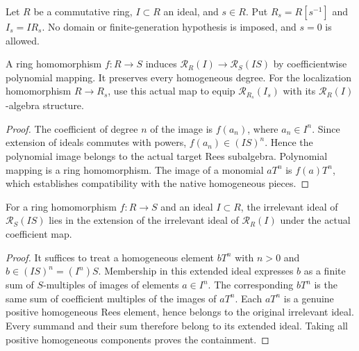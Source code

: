\endgroup

\begingroup

Let $R$ be a commutative ring, $I\subset R$ an ideal, and $s\in R$.
Put $R_s=R[s^{-1}]$ and $I_s=IR_s$. No domain or finite-generation
hypothesis is imposed, and $s=0$ is allowed.

\begin{definition}
\label{def:rees-localization-map}
\leanok
A ring homomorphism $f:R\to S$ induces
$\mathcal R_R(I)\to\mathcal R_S(IS)$ by coefficientwise polynomial
mapping. It preserves every homogeneous degree. For the localization
homomorphism $R\to R_s$, use this actual map to equip
$\mathcal R_{R_s}(I_s)$ with its $\mathcal R_R(I)$-algebra structure.
\end{definition}
\begin{proof}
The coefficient of degree $n$ of the image is $f(a_n)$, where
$a_n\in I^n$. Since extension of ideals commutes with powers,
$f(a_n)\in(IS)^n$. Hence the polynomial image belongs to the actual
target Rees subalgebra. Polynomial mapping is a ring homomorphism.
The image of a monomial $aT^n$ is $f(a)T^n$, which establishes
compatibility with the native homogeneous pieces.
\end{proof}

\endgroup

\begingroup

\begin{lemma}
\label{lem:rees-coefficient-irrelevant}
\leanok
For a ring homomorphism $f:R\to S$ and an ideal $I\subset R$, the
irrelevant ideal of $\mathcal R_S(IS)$ lies in the extension of the
irrelevant ideal of $\mathcal R_R(I)$ under the actual coefficient map.
\end{lemma}
\begin{proof}
It suffices to treat a homogeneous element $bT^n$ with $n>0$ and
$b\in(IS)^n=(I^n)S$. Membership in this extended ideal expresses $b$
as a finite sum of $S$-multiples of images of elements $a\in I^n$.
The corresponding $bT^n$ is the same sum of coefficient multiples of
the images of $aT^n$. Each $aT^n$ is a genuine positive homogeneous
Rees element, hence belongs to the original irrelevant ideal. Every
summand and their sum therefore belong to its extended ideal. Taking
all positive homogeneous components proves the containment.
\end{proof}

